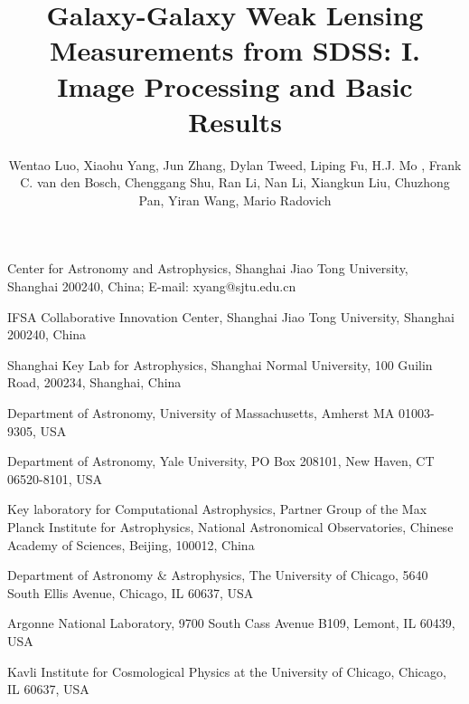 \documentclass[apj]{emulateapj}
\begin{document}

\title{Galaxy-Galaxy Weak Lensing Measurements from SDSS: I. Image Processing and Basic Results}

\author{Wentao Luo, Xiaohu Yang,
  Jun Zhang, Dylan Tweed, Liping
  Fu, H.J. Mo , Frank C. van den
  Bosch, Chenggang Shu, Ran
  Li, Nan Li, Xiangkun
  Liu, Chuzhong Pan, Yiran
  Wang, Mario Radovich }


 {Center for Astronomy and Astrophysics, Shanghai Jiao
  Tong University, Shanghai 200240, China; E-mail: xyang@sjtu.edu.cn}
  
 {IFSA Collaborative Innovation Center, Shanghai Jiao
  Tong University, Shanghai 200240, China}


 { Shanghai Key Lab for Astrophysics, Shanghai Normal
  University, 100 Guilin Road, 200234, Shanghai, China}

 {Department of Astronomy, University of Massachusetts, Amherst
  MA 01003-9305, USA}

 {Department of Astronomy, Yale University, PO Box 208101,
  New Haven, CT 06520-8101, USA}

 {Key laboratory for Computational Astrophysics, 
  Partner Group of the Max Planck Institute for Astrophysics, 
  National Astronomical Observatories, Chinese Academy of Sciences, 
  Beijing, 100012, China }

 {Department of Astronomy \& Astrophysics, The University of Chicago,
  5640 South Ellis Avenue, Chicago, IL 60637, USA}

 {Argonne National Laboratory, 9700 South Cass Avenue B109,
  Lemont, IL 60439, USA}

 {Kavli Institute for Cosmological Physics at the University of Chicago,
  Chicago, IL 60637, USA}
\end{document}
